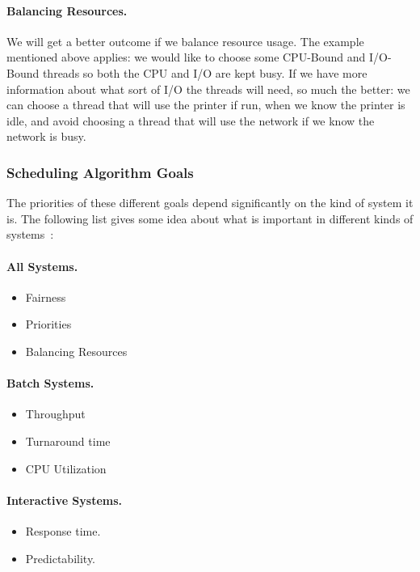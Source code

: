 \paragraph{Balancing Resources.} We will get a better outcome if we balance resource usage. The example mentioned above applies: we would like to choose some CPU-Bound and I/O-Bound threads so both the CPU and I/O are kept busy. If we have more information about what sort of I/O the threads will need, so much the better: we can choose a thread that will use the printer if run, when we know the printer is idle, and avoid choosing a thread that will use the network if we know the network is busy.

\subsubsection*{Scheduling Algorithm Goals}

The priorities of these different goals depend significantly on the kind of system it is. The following list gives some idea about what is important in different kinds of systems~\cite{mos}:

\paragraph{All Systems.}
\begin{itemize}
	\item Fairness
	\item Priorities
	\item Balancing Resources
\end{itemize}

\paragraph{Batch Systems.}
\begin{itemize}
	\item Throughput
	\item Turnaround time
	\item CPU Utilization
\end{itemize}

\paragraph{Interactive Systems.}
\begin{itemize}
	\item Response time.
	\item Predictability.
\end{itemize}

